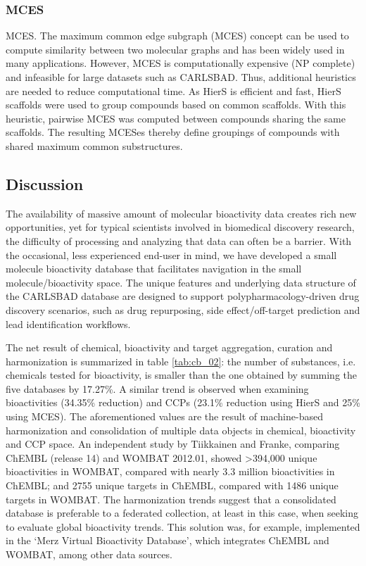 \subsubsection{MCES}

MCES. The maximum common edge subgraph (MCES) concept\cite{Raymond2002-ep} can be used to compute similarity between two molecular graphs and has been widely used in many applications\cite{Stahl2005-bl,Sheridan2006-nx,Gardiner2007-ur,Bocker2008-uh,Hariharan2011-qx,Bostrom2012-fb}. However, MCES is computationally expensive (NP complete) and infeasible for large datasets such as CARLSBAD. Thus, additional heuristics are needed to reduce computational time. As HierS is efficient and fast, HierS scaffolds were used to group compounds based on common scaffolds. With this heuristic, pairwise MCES was computed between compounds sharing the same scaffolds. The resulting MCESes thereby define groupings of compounds with shared maximum common substructures.

\subsection{Discussion}

The availability of massive amount of molecular bioactivity data creates rich new opportunities, yet for typical scientists involved in biomedical discovery research, the difficulty of processing and analyzing that data can often be a barrier. With the occasional, less experienced end-user in mind, we have developed a small molecule bioactivity database that facilitates navigation in the small molecule/bioactivity space. The unique features and underlying data structure of the CARLSBAD database are designed to support polypharmacology-driven drug discovery scenarios, such as drug repurposing, side effect/off-target prediction and lead identification workflows.

The net result of chemical, bioactivity and target aggregation, curation and harmonization is summarized in table \ref{tab:cb_02}: the number of substances, i.e. chemicals tested for bioactivity, is smaller than the one obtained by summing the five databases by 17.27\%. A similar trend is observed when examining bioactivities (34.35\% reduction) and CCPs (23.1\% reduction using HierS and 25\% using MCES). The aforementioned values are the result of machine-based harmonization and consolidation of multiple data objects in chemical, bioactivity and CCP space. An independent study by Tiikkainen and Franke\cite{Tiikkainen2013-md,UniProt_Consortium2018-kq}, comparing ChEMBL (release 14) and WOMBAT 2012.01, showed \textgreater 394,000 unique bioactivities in WOMBAT, compared with nearly 3.3 million bioactivities in ChEMBL; and 2755 unique targets in ChEMBL, compared with 1486 unique targets in WOMBAT. The harmonization trends suggest that a consolidated database is preferable to a federated collection, at least in this case, when seeking to evaluate global bioactivity trends. This solution was, for example, implemented in the ‘Merz Virtual Bioactivity Database’, which integrates ChEMBL and WOMBAT, among other data sources.

